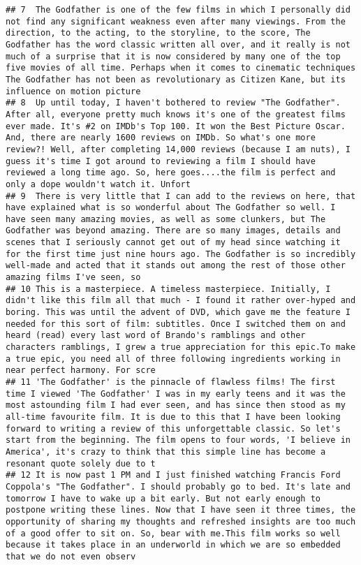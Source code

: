 \documentclass[
]{article}
\begin{document}
\begin{verbatim}
## 7  The Godfather is one of the few films in which I personally did not find any significant weakness even after many viewings. From the direction, to the acting, to the storyline, to the score, The Godfather has the word classic written all over, and it really is not much of a surprise that it is now considered by many one of the top five movies of all time. Perhaps when it comes to cinematic techniques The Godfather has not been as revolutionary as Citizen Kane, but its influence on motion picture
## 8  Up until today, I haven't bothered to review "The Godfather". After all, everyone pretty much knows it's one of the greatest films ever made. It's #2 on IMDb's Top 100. It won the Best Picture Oscar. And, there are nearly 1600 reviews on IMDb. So what's one more review?! Well, after completing 14,000 reviews (because I am nuts), I guess it's time I got around to reviewing a film I should have reviewed a long time ago. So, here goes....the film is perfect and only a dope wouldn't watch it. Unfort
## 9  There is very little that I can add to the reviews on here, that have explained what is so wonderful about The Godfather so well. I have seen many amazing movies, as well as some clunkers, but The Godfather was beyond amazing. There are so many images, details and scenes that I seriously cannot get out of my head since watching it for the first time just nine hours ago. The Godfather is so incredibly well-made and acted that it stands out among the rest of those other amazing films I've seen, so
## 10 This is a masterpiece. A timeless masterpiece. Initially, I didn't like this film all that much - I found it rather over-hyped and boring. This was until the advent of DVD, which gave me the feature I needed for this sort of film: subtitles. Once I switched them on and heard (read) every last word of Brando's ramblings and other characters ramblings, I grew a true appreciation for this epic.To make a true epic, you need all of three following ingredients working in near perfect harmony. For scre
## 11 'The Godfather' is the pinnacle of flawless films! The first time I viewed 'The Godfather' I was in my early teens and it was the most astounding film I had ever seen, and has since then stood as my all-time favourite film. It is due to this that I have been looking forward to writing a review of this unforgettable classic. So let's start from the beginning. The film opens to four words, 'I believe in America', it's crazy to think that this simple line has become a resonant quote solely due to t
## 12 It is now past 1 PM and I just finished watching Francis Ford Coppola's "The Godfather". I should probably go to bed. It's late and tomorrow I have to wake up a bit early. But not early enough to postpone writing these lines. Now that I have seen it three times, the opportunity of sharing my thoughts and refreshed insights are too much of a good offer to sit on. So, bear with me.This film works so well because it takes place in an underworld in which we are so embedded that we do not even observ

\end{verbatim}
\end{document}
